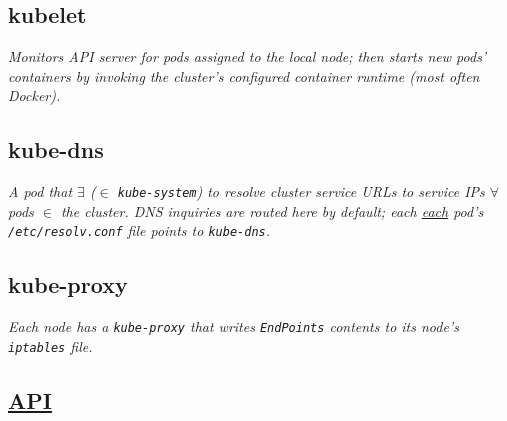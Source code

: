 \subsection*{kubelet}
{\footnotesize \textit{Monitors API server for pods assigned to the local node; then starts new pods' containers by invoking the cluster's configured container runtime (most often Docker).}}


\subsection*{kube-dns}
{\footnotesize \textit{A pod that $\exists$ ($\in$ {\tt kube-system}) to resolve cluster service URLs to service IPs $\forall$ pods $\in$ the cluster. DNS inquiries are routed here by default; each \ul{each} pod's {\tt /etc/resolv.conf} file points to {\tt kube-dns}.}}



\subsection*{kube-proxy}
\textit{Each node has a {\tt kube-proxy} that writes {\tt EndPoints} contents to its node's {\tt iptables} file.}



\subsection*{\href{https://github.com/kubernetes/community/blob/master/contributors/design-proposals/architecture/resource-management.md}{API}}

